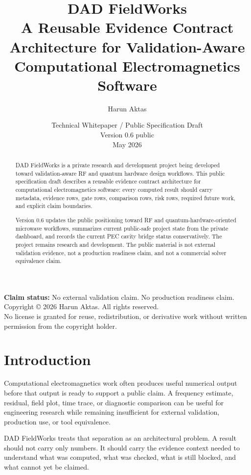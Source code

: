 \documentclass[11pt,a4paper]{article}
\title{\textbf{DAD FieldWorks}\\
{\large A Reusable Evidence Contract Architecture for Validation-Aware Computational Electromagnetics Software}}
\author{Harun Aktas}
\date{Technical Whitepaper / Public Specification Draft\\Version 0.6 public\\May 2026}
\begin{document}
\maketitle

\begin{center}
\textbf{Claim status:} No external validation claim. No production readiness claim.\\
Copyright \copyright{} 2026 Harun Aktas. All rights reserved.\\
No license is granted for reuse, redistribution, or derivative work without written permission from the copyright holder.
\end{center}

\newpage

\begin{abstract}
DAD FieldWorks is a private research and development project being developed toward validation-aware RF and quantum hardware design workflows. This public specification draft describes a reusable evidence contract architecture for computational electromagnetics software: every computed result should carry metadata, evidence rows, gate rows, comparison rows, risk rows, required future work, and explicit claim boundaries.

Version 0.6 updates the public positioning toward RF and quantum-hardware-oriented microwave workflows, summarizes current public-safe project state from the private dashboard, and records the current PEC cavity bridge status conservatively. The project remains research and development. The public material is not external validation evidence, not a production readiness claim, and not a commercial solver equivalence claim.
\end{abstract}

\tableofcontents
\newpage

\section{Introduction}
\label{sec:introduction}

Computational electromagnetics work often produces useful numerical output before that output is ready to support a public claim. A frequency estimate, residual, field plot, time trace, or diagnostic comparison can be useful for engineering research while remaining insufficient for external validation, production use, or tool equivalence.

DAD FieldWorks treats that separation as an architectural problem. A result should not carry only numbers. It should carry the evidence context needed to understand what was computed, what was checked, what is still blocked, and what cannot yet be claimed.
\end{document}
